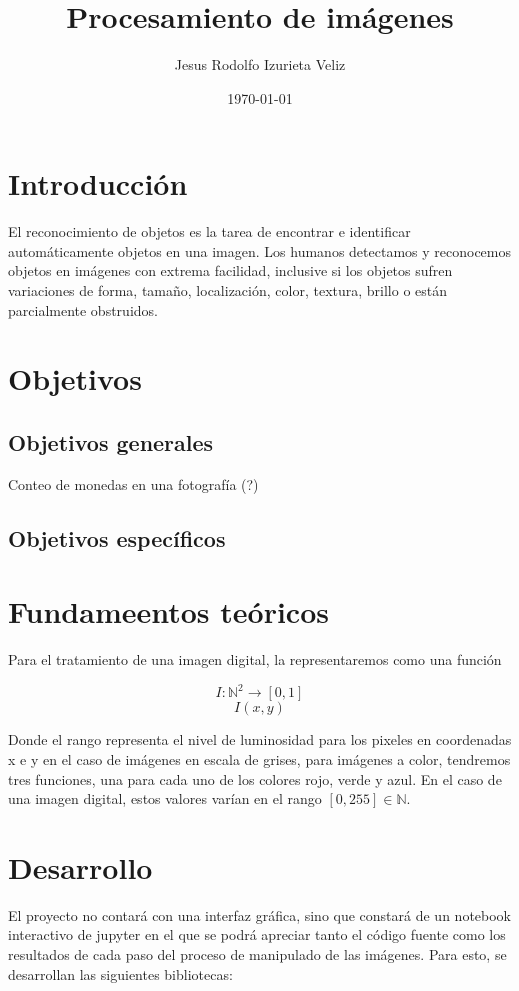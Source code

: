 \documentclass[letter]{article}
\author{Jesus Rodolfo Izurieta Veliz}
\date{\today}
\title{Procesamiento de imágenes}
\begin{document}
\maketitle

\section{Introducción}
\label{sec:org853b42c}
El reconocimiento de objetos es la tarea de encontrar e identificar
automáticamente objetos en una imagen. Los humanos detectamos y reconocemos
objetos en imágenes con extrema facilidad, inclusive si los objetos sufren
variaciones de forma, tamaño, localización, color, textura, brillo o están
parcialmente obstruidos.

\section{Objetivos}
\label{sec:orgb4f4ba9}
\subsection{Objetivos generales}
\label{sec:org3742004}
Conteo de monedas en una fotografía (?)

\subsection{Objetivos específicos}
\label{sec:org0c6206b}

\section{Fundameentos teóricos}
\label{sec:orgc684dc2}
Para el tratamiento de una imagen digital, la representaremos como una función

$$ I:\mathbb N^2 \rightarrow [0, 1] $$
$$ I(x, y) $$

Donde el rango representa el nivel de luminosidad para los pixeles en
coordenadas x e y en el caso de imágenes en escala de grises, para imágenes a
color, tendremos tres funciones, una para cada uno de los colores rojo, verde y
azul. En el caso de una imagen digital, estos valores varían en el rango
\([0,255]\in \mathbb N\).

\section{Desarrollo}
\label{sec:org398a4de}
El proyecto no contará con una interfaz gráfica, sino que constará de un
notebook interactivo de jupyter en el que se podrá apreciar tanto el código
fuente como los resultados de cada paso del proceso de manipulado de las
imágenes. Para esto, se desarrollan las siguientes bibliotecas:
\end{document}
